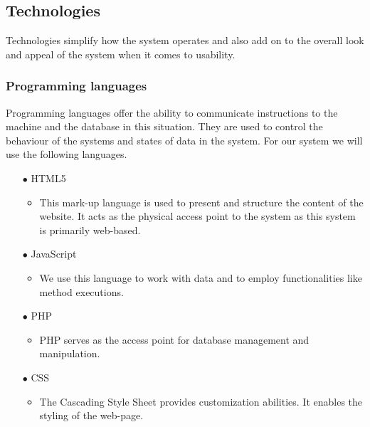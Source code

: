 \documentclass[a4paper,12pt]{article}
\begin{document}
\newpage
\subsection{Technologies}
\begin{flushleft}
	Technologies simplify how the system operates and also add on to the overall look and appeal of the system when it comes to usability.
	
	\subsubsection{Programming languages}
	Programming languages offer the ability to communicate instructions to the machine and the database in this situation. They are used to control the behaviour of the systems and states of data in the system. For our system we will use the following languages.
	
	\begin{itemize}
		\item[$\bullet$] HTML5
		\begin{itemize}
		\item This mark-up language is used to present and structure the content of the website. It acts as the physical access point to the system as this system is primarily web-based.
		\end{itemize}
		
		\item[$\bullet$] JavaScript
		\begin{itemize}
		\item We use this language to work with data and to employ functionalities like method executions.
		\end{itemize}
		
		\item[$\bullet$] PHP
		\begin{itemize}
		\item PHP serves as the access point for database management and manipulation.
		\end{itemize}
		
		\item[$\bullet$] CSS
		\begin{itemize}
		\item The Cascading Style Sheet provides customization abilities. It enables the styling of the web-page.
		\end{itemize}
		
	\end{itemize}
	

\end{flushleft}
\end{document}
